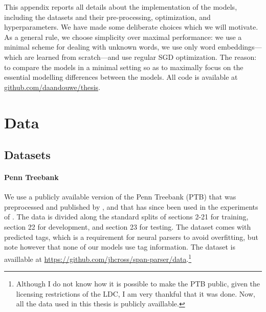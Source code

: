 This appendix reports all details about the implementation of the models, including the datasets and their pre-processing, optimization, and hyperparameters. We have made some deliberate choices which we will motivate. As a general rule, we choose simplicity over maximal performance: we use a minimal scheme for dealing with unknown words, we use only word embeddings---which are learned from scratch---and use regular SGD optimization. The reason: to compare the models in a minimal setting so as to maximally focus on the essential modelling differences between the models. All code is available at \url{github.com/daandouwe/thesis}.

\section{Data}

  \subsection{Datasets}

    \paragraph{Penn Treebank}
    We use a publicly available version of the Penn Treebank (PTB) that was preprocessed and published by \citet{cross2016span}, and that has since been used in the experiments of \citet{stern2017minimal,kitaev2018attentive}. The data is divided along the standard splits of sections 2-21 for training, section 22 for development, and section 23 for testing. The dataset comes with predicted tags, which is a requirement for neural parsers to avoid overfitting, but note however that none of our models use tag information. The dataset is availlable at \url{https://github.com/jhcross/span-parser/data}.\footnote{Although I do not know how it is possible to make the PTB public, given the licensing restrictions of the LDC, I am very thankful that it was done. Now, all the data used in this thesis is publicly availlable.}

